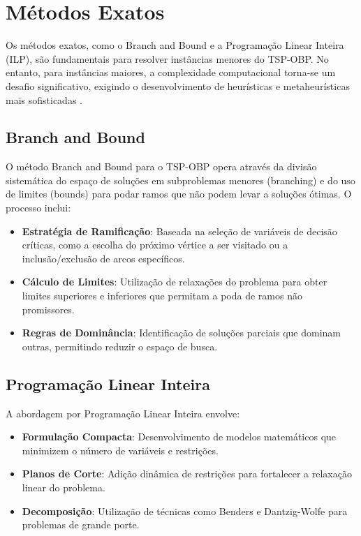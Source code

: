 \documentclass[12pt, a4paper]{report}
\begin{document}
\section{Métodos Exatos}
Os métodos exatos, como o Branch and Bound e a Programação Linear Inteira (ILP), são fundamentais para resolver instâncias menores do TSP-OBP. No entanto, para instâncias maiores, a complexidade computacional torna-se um desafio significativo, exigindo o desenvolvimento de heurísticas e metaheurísticas mais sofisticadas \cite{lopesfilho2019, carvalho2022}.

\subsection{Branch and Bound}
O método Branch and Bound para o TSP-OBP opera através da divisão sistemática do espaço de soluções em subproblemas menores (branching) e do uso de limites (bounds) para podar ramos que não podem levar a soluções ótimas. O processo inclui:

\begin{itemize}
    \item \textbf{Estratégia de Ramificação}: Baseada na seleção de variáveis de decisão críticas, como a escolha do próximo vértice a ser visitado ou a inclusão/exclusão de arcos específicos.
    
    \item \textbf{Cálculo de Limites}: Utilização de relaxações do problema para obter limites superiores e inferiores que permitam a poda de ramos não promissores.
    
    \item \textbf{Regras de Dominância}: Identificação de soluções parciais que dominam outras, permitindo reduzir o espaço de busca.
\end{itemize}

\subsection{Programação Linear Inteira}
A abordagem por Programação Linear Inteira envolve:

\begin{itemize}
    \item \textbf{Formulação Compacta}: Desenvolvimento de modelos matemáticos que minimizem o número de variáveis e restrições.
    
    \item \textbf{Planos de Corte}: Adição dinâmica de restrições para fortalecer a relaxação linear do problema.
    
    \item \textbf{Decomposição}: Utilização de técnicas como Benders e Dantzig-Wolfe para problemas de grande porte.
\end{itemize}
\end{document}
